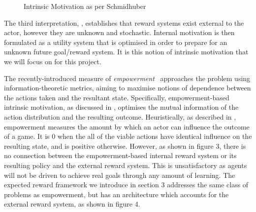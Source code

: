 \documentclass{article}
\begin{document}
\begin{figure}[h]
\centering
{}
\caption{Intrinsic Motivation as per Schmidhuber} \label{fig:M2}
\end{figure}

The third interpretation, \cite{mohamed2015variational,salge2014empowerment}, establishes that reward systems exist external to the actor, however they are unknown and stochastic. Internal motivation is then formulated as a utility system that is optimised in order to prepare for an unknown future goal/reward system. It is this notion of intrinsic motivation that we will focus on for this project. 

The recently-introduced measure of \emph{empowerment}~\citep{mohamed2015variational, salge2014empowerment} approaches the problem using information-theoretic metrics, aiming to maximise notions of dependence between the actions taken and the resultant state. Specifically, empowerment-based intrinsic motivation, as discussed in \citep{mohamed2015variational}, optimises the mutual information of the action distribution and the resulting outcome.
Heuristically, as described in \cite{salge2014empowerment}, empowerment measures the amount by which an actor can influence the outcome of a game.
It is $0$ when the all of the viable actions have identical influence on the resulting state, and is positive otherwise. However, as shown in figure 3, there is no connection between the empowerment-based internal reward system or its resulting policy and the external reward system. This is unsatisfactory as agents will not be driven to achieve real goals through any amount of learning. The expected reward framework we introduce in section 3 addresses the same class of problems as empowerment, but has an architecture which accounts for the external reward system, as shown in figure 4. 
\end{document}
